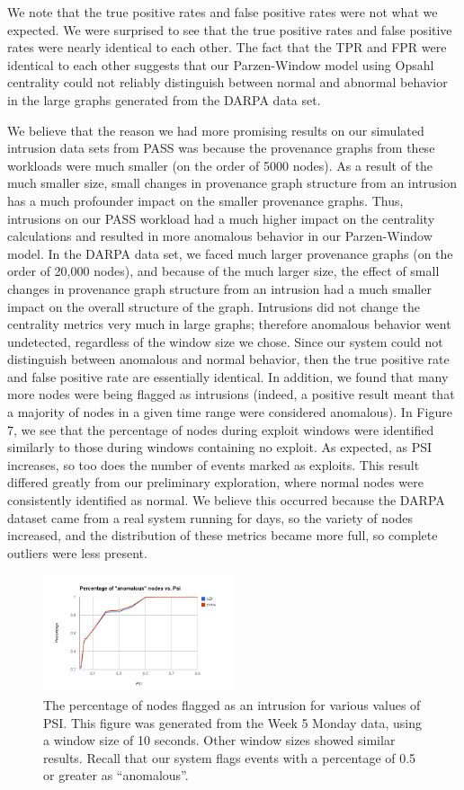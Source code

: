 \documentclass[10pt,twocolumn]{article}
\begin{document}
We note that the true positive rates and false positive rates were not what we expected. We were surprised to see that the true positive rates and false positive rates were nearly identical to each other. The fact that the TPR and FPR were identical to each other suggests that our Parzen-Window model using Opsahl centrality could not reliably distinguish between normal and abnormal behavior in the large graphs generated from the DARPA data set. 

We believe that the reason we had more promising results on our simulated intrusion data sets from PASS was because the provenance graphs from these workloads were much smaller (on the order of 5000 nodes). As a result of the much smaller size, small changes in provenance graph structure from an intrusion has a much profounder impact on the smaller provenance graphs. Thus, intrusions on our PASS workload had a much higher impact on the centrality calculations and resulted in more anomalous behavior in our Parzen-Window model. In the DARPA data set, we faced much larger provenance graphs (on the order of 20,000 nodes), and because of the much larger size, the effect of small changes in provenance graph structure from an intrusion had a much smaller impact on the overall structure of the graph. Intrusions did not change the centrality metrics very much in large graphs; therefore anomalous behavior went undetected, regardless of the window size we chose. Since our system could not distinguish between anomalous and normal behavior, then the true positive rate and false positive rate are essentially identical. In addition, we found that many more nodes were being flagged as intrusions (indeed, a positive result meant that a majority of nodes in a given time range were considered anomalous). In Figure 7, we see that the percentage of nodes during exploit windows were identified similarly to those during windows containing no exploit. As expected, as PSI increases, so too does the number of events marked as exploits. This result differed greatly from our preliminary exploration, where normal nodes were consistently identified as normal. We believe this occurred because the DARPA dataset came from a real system running for days, so the variety of nodes increased, and the distribution of these metrics became more full, so complete outliers were less present. 
\begin{figure}
  \label{intrusion-v-psi}
  \centering
    \includegraphics[width=0.5\textwidth]{img/intrusion_v_psi.png}
    \caption{The percentage of nodes flagged as an intrusion for various values of PSI. This figure was generated from the Week 5 Monday data, using a window size of 10 seconds. Other window sizes showed similar results. Recall that our system flags events with a percentage of 0.5 or greater as ``anomalous''.} 
\end{figure}
\end{document}
